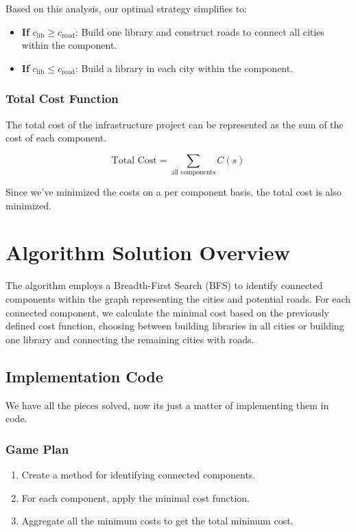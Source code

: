 \documentclass[11pt, a4paper, oneside]{article}
\begin{document}
Based on this analysis, our optimal strategy simplifies to:

\begin{itemize}
  \item \textbf{If} \( c_{\text{lib}} \geq c_{\text{road}} \): Build one library and construct roads to connect all cities within the component.
  \item \textbf{If} \( c_{\text{lib}} \leq c_{\text{road}} \): Build a library in each city within the component.
\end{itemize}

\subsubsection*{Total Cost Function}

The total cost of the infrastructure project can be represented as the sum of the cost of each component.

\[\text{Total Cost} = \sum_{\text{all components}} C(s)\]

Since we've minimized the costs on a per component basis, the total cost is also minimized.

\section*{Algorithm Solution Overview}

The algorithm employs a Breadth-First Search (BFS) to identify connected components within the graph representing the cities and potential roads. For each connected component, we calculate the minimal cost based on the previously defined cost function, choosing between building libraries in all cities or building one library and connecting the remaining cities with roads.

\subsection*{Implementation Code}

We have all the pieces solved, now its just a matter of implementing them in code.

\subsubsection*{Game Plan}

\begin{enumerate}
  \item Create a method for identifying connected components.
  \item For each component, apply the minimal cost function.
  \item Aggregate all the minimum costs to get the total minimum cost.
\end{enumerate}
\end{document}
